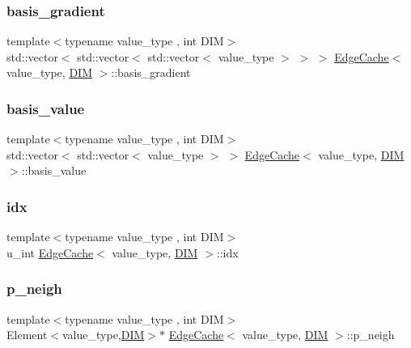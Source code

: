 \subsubsection{\texorpdfstring{basis\+\_\+gradient}{basis\_gradient}}
{\footnotesize\ttfamily template$<$typename value\+\_\+type , int D\+IM$>$ \\
std\+::vector$<$ std\+::vector$<$ std\+::vector$<$ value\+\_\+type $>$ $>$ $>$ \mbox{\hyperlink{struct_edge_cache}{Edge\+Cache}}$<$ value\+\_\+type, \mbox{\hyperlink{complex__node___t_h_f_e_m_2uiexp_8h_a589b8b9bfdf714f736059845d568b597}{D\+IM}} $>$\+::basis\+\_\+gradient}

\mbox{\label{struct_edge_cache_a777fbadecd88c241148cfb65b30d2d2b}} 
\subsubsection{\texorpdfstring{basis\+\_\+value}{basis\_value}}
{\footnotesize\ttfamily template$<$typename value\+\_\+type , int D\+IM$>$ \\
std\+::vector$<$ std\+::vector$<$ value\+\_\+type $>$ $>$ \mbox{\hyperlink{struct_edge_cache}{Edge\+Cache}}$<$ value\+\_\+type, \mbox{\hyperlink{complex__node___t_h_f_e_m_2uiexp_8h_a589b8b9bfdf714f736059845d568b597}{D\+IM}} $>$\+::basis\+\_\+value}

\mbox{\label{struct_edge_cache_a41d2d7d840a282ed36366825d3d592b0}} 
\subsubsection{\texorpdfstring{idx}{idx}}
{\footnotesize\ttfamily template$<$typename value\+\_\+type , int D\+IM$>$ \\
u\+\_\+int \mbox{\hyperlink{struct_edge_cache}{Edge\+Cache}}$<$ value\+\_\+type, \mbox{\hyperlink{complex__node___t_h_f_e_m_2uiexp_8h_a589b8b9bfdf714f736059845d568b597}{D\+IM}} $>$\+::idx}

\mbox{\label{struct_edge_cache_a35850c44237dee932b3dfa69d9a0d87d}} 
\subsubsection{\texorpdfstring{p\+\_\+neigh}{p\_neigh}}
{\footnotesize\ttfamily template$<$typename value\+\_\+type , int D\+IM$>$ \\
Element$<$value\+\_\+type,\mbox{\hyperlink{complex__node___t_h_f_e_m_2uiexp_8h_a589b8b9bfdf714f736059845d568b597}{D\+IM}}$>$$\ast$ \mbox{\hyperlink{struct_edge_cache}{Edge\+Cache}}$<$ value\+\_\+type, \mbox{\hyperlink{complex__node___t_h_f_e_m_2uiexp_8h_a589b8b9bfdf714f736059845d568b597}{D\+IM}} $>$\+::p\+\_\+neigh}

